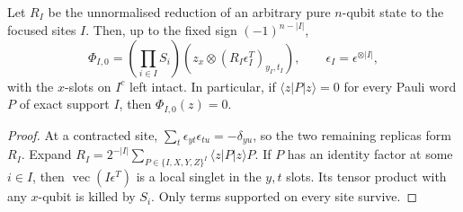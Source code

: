 \begin{lemma}\label{lem:focus-pauli}
Let $R_I$ be the unnormalised reduction of an arbitrary pure $n$-qubit
state to the focused sites $I$. Then, up to the fixed sign
$(-1)^{n-|I|}$,
\[
 \Phi_{I,0}= \left(\prod_{i\in I}S_i\right)
 \left(z_x\otimes (R_I\epsilon_I^T)_{y_I,t_I}\right),
 \qquad \epsilon_I=\epsilon^{\otimes|I|},
\]
with the $x$-slots on $I^c$ left intact. In particular, if
$\langle z|P|z\rangle=0$ for every Pauli word $P$ of exact support
$I$, then $\Phi_{I,0}(z)=0$.
\end{lemma}
\begin{proof}
At a contracted site,
$\sum_t\epsilon_{yt}\epsilon_{tu}=-\delta_{yu}$,
so the two remaining replicas form $R_I$. Expand
$R_I=2^{-|I|}\sum_{P\in\{I,X,Y,Z\}^{I}}
\langle z|P|z\rangle P$.
If $P$ has an identity factor at some $i\in I$, then
$\operatorname{vec}(I\epsilon^T)$ is a local singlet in the $y,t$
slots. Its tensor product with any $x$-qubit is killed by $S_i$.
Only terms supported on every site survive.
\end{proof}

